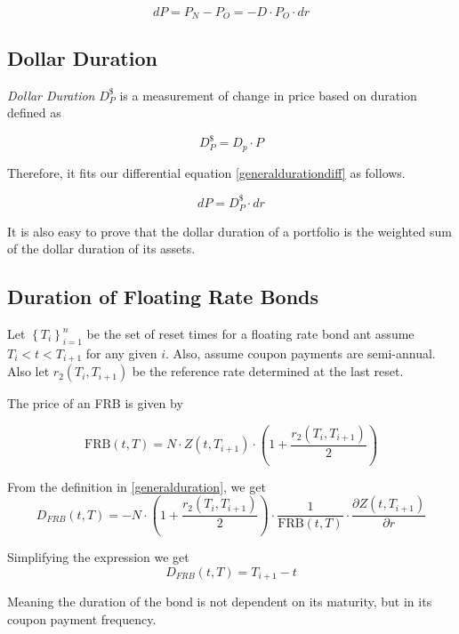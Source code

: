 \documentclass[10pt,letterpaper]{article}
\begin{document}
\begin{equation}\label{newgeneraldurationdiff}
dP = P_N - P_O = - D\cdot P_O\cdot dr 
\end{equation}

\subsection{Dollar Duration}

\emph{Dollar Duration} $D_P^\$$ is a measurement of change in price based on duration defined as 

\begin{equation}\label{dollardur}
D_P^\$ = D_p\cdot P
\end{equation}

Therefore, it fits our differential equation \eqref{generaldurationdiff} as follows.

\begin{equation}\label{dollardurationdiff}
dP = D_P^\$ \cdot dr
\end{equation}

It is also easy to prove that the dollar duration of a portfolio is the weighted sum of the dollar duration of its assets.

\subsection{Duration of Floating Rate Bonds}
Let $\left\lbrace T_i\right\rbrace_{i=1}^n$ be the set of reset times for a floating rate bond ant assume $T_i < t <T_{i+1}$ for any given $i$. Also, assume coupon payments are semi-annual. Also let $r_2(T_i, T_{i+1})$ be the reference rate determined at the last reset.

The price of an FRB is given by

$$
\mbox{FRB}(t,T) = N\cdot Z(t,T_{i+1})\cdot\left( 1 +\frac{r_2(T_i, T_{i+1})}{2}\right)
$$

From the definition in \eqref{generalduration}, we get 
$$
D_{FRB}(t, T) = - N\cdot\left( 1 +\frac{r_2(T_i, T_{i+1})}{2}\right)\cdot\frac{1}{\mbox{FRB}(t, T)}\cdot\frac{\partial Z(t, T_{i+1})}{\partial r}
$$

Simplifying the expression we get
\begin{equation}\label{frbduration}
D_{FRB}(t, T) = T_{i+1} - t
\end{equation}

Meaning the duration of the bond is not dependent on its maturity, but in its coupon payment frequency.
\end{document}

